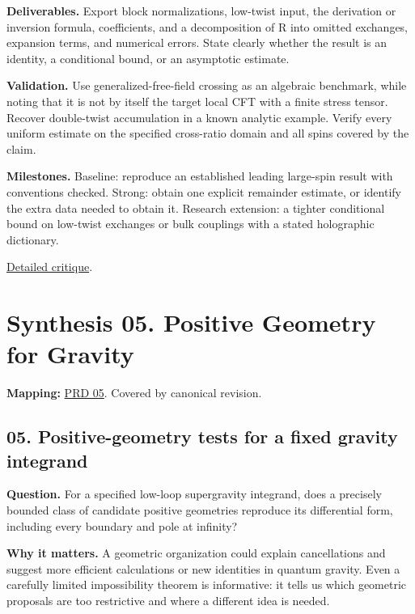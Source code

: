 \documentclass[
  11pt,
]{article}
\begin{document}
\textbf{Deliverables.} Export block normalizations, low-twist input, the
derivation or inversion formula, coefficients, and a decomposition of R
into omitted exchanges, expansion terms, and numerical errors. State
clearly whether the result is an identity, a conditional bound, or an
asymptotic estimate.

\textbf{Validation.} Use generalized-free-field crossing as an algebraic
benchmark, while noting that it is not by itself the target local CFT
with a finite stress tensor. Recover double-twist accumulation in a
known analytic example. Verify every uniform estimate on the specified
cross-ratio domain and all spins covered by the claim.

\textbf{Milestones.} Baseline: reproduce an established leading
large-spin result with conventions checked. Strong: obtain one explicit
remainder estimate, or identify the extra data needed to obtain it.
Research extension: a tighter conditional bound on low-twist exchanges
or bulk couplings with a stated holographic dictionary.

\href{https://github.com/rick-stevens-ai/Pure-Thought/blob/main/reviews/04-Modular-Lightcone-Bootstrap.md}{Detailed
critique}.

\section{Synthesis 05. Positive Geometry for Gravity}

\textbf{Mapping:}
\href{https://github.com/rick-stevens-ai/Pure-Thought/blob/main/PRDs/05-Positive-Geometry-Gravity.md}{PRD
05}. Covered by canonical revision.

\subsection{05. Positive-geometry tests for a fixed gravity integrand}

\textbf{Question.} For a specified low-loop supergravity integrand, does
a precisely bounded class of candidate positive geometries reproduce its
differential form, including every boundary and pole at infinity?

\textbf{Why it matters.} A geometric organization could explain
cancellations and suggest more efficient calculations or new identities
in quantum gravity. Even a carefully limited impossibility theorem is
informative: it tells us which geometric proposals are too restrictive
and where a different idea is needed.
\end{document}
